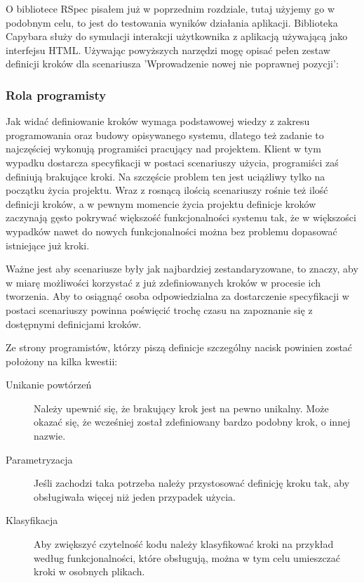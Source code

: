       O bibliotece RSpec pisałem już w poprzednim rozdziale, tutaj użyjemy go w podobnym celu, to jest do testowania wyników działania aplikacji. Biblioteka Capybara służy do symulacji interakcji użytkownika z aplikacją używającą jako interfejsu HTML. Używając powyższych narzędzi mogę opisać pełen zestaw definicji kroków dla scenariusza 'Wprowadzenie nowej nie poprawnej pozycji':
      
      
      
    \subsubsection{Rola programisty}
    
      Jak widać definiowanie kroków wymaga podstawowej wiedzy z zakresu programowania oraz budowy opisywanego systemu, dlatego też zadanie to najczęściej wykonują programiści pracujący nad projektem.  Klient w tym wypadku dostarcza specyfikacji w postaci scenariuszy użycia, programiści zaś definiują brakujące kroki. Na szczęście problem ten jest uciążliwy tylko na początku życia projektu. Wraz z rosnącą ilością scenariuszy rośnie też ilość definicji kroków, a w pewnym momencie życia projektu definicje kroków zaczynają gęsto pokrywać większość funkcjonalności systemu tak, że w większości wypadków nawet do nowych funkcjonalności można bez problemu dopasować istniejące już kroki.
      
      Ważne jest aby scenariusze były jak najbardziej zestandaryzowane, to znaczy, aby w miarę możliwości korzystać z już zdefiniowanych kroków w procesie ich tworzenia. Aby to osiągnąć osoba odpowiedzialna  za dostarczenie specyfikacji w postaci scenariuszy powinna poświęcić trochę czasu na zapoznanie się z dostępnymi definicjami kroków.
      
      Ze strony programistów, którzy piszą definicje szczególny nacisk powinien zostać położony na kilka kwestii:
      
      \begin{description}
        \item[Unikanie powtórzeń] Należy upewnić się, że brakujący krok jest na pewno unikalny. Może okazać się, że wcześniej został zdefiniowany bardzo podobny krok, o innej nazwie.
        \item[Parametryzacja] Jeśli zachodzi taka potrzeba należy przystosować definicję kroku tak, aby obsługiwała więcej niż jeden przypadek użycia.
        \item[Klasyfikacja] Aby zwiększyć czytelność kodu należy klasyfikować kroki na przykład według funkcjonalności, które obsługują, można w tym celu umieszczać kroki w osobnych plikach.
      \end{description}
      
